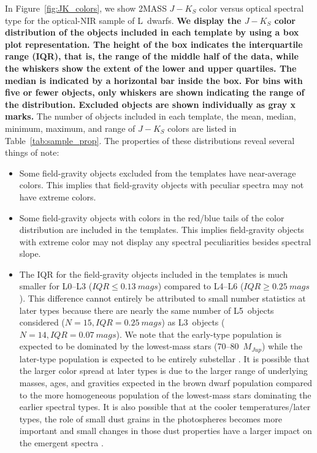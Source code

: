 \documentclass[12pt]{aastex6}
\begin{document}
In Figure~\ref{fig:JK_colors}, we show 2MASS $J-K_S$ color versus optical spectral type for the optical-NIR sample of L~dwarfs.
\textbf{We display the $J-K_S$ color distribution of the objects included in each template by using a box plot representation. The height of the box indicates the interquartile range (IQR), that is, the range of the middle half of the data, while the whiskers show the extent of the lower and upper quartiles. The median is indicated by a horizontal bar inside the box. For bins with five or fewer objects, only whiskers are shown indicating the range of the distribution. Excluded objects are shown individually as gray x marks.}
The number of objects included in each template, the mean, median, minimum, maximum, and range of $J-K_S$ colors are listed in Table~\ref{tab:sample_prop}.
The properties of these distributions reveal several things of note:
\begin{itemize}
\item Some field-gravity objects excluded from the templates have near-average colors. This implies that field-gravity objects with peculiar spectra may not have extreme colors.
\item Some field-gravity objects with colors in the red/blue tails of the color distribution are included in the templates. This implies field-gravity objects with extreme color may not display any spectral peculiarities besides spectral slope.
\item The IQR for the field-gravity objects included in the templates is much smaller for L0--L3 ($IQR\le0.13~mags$) compared to L4--L6 ($IQR\ge0.25~mags$).
This difference cannot entirely be attributed to small number statistics at later types because there are nearly the same number of L5~objects considered ($N=15,IQR=0.25~mags$) as L3~objects ($N=14,IQR=0.07~mags$).
We note that the early-type population is expected to be dominated by the lowest-mass stars (70--80~$M_{Jup}$) while the later-type population is expected to be entirely substellar \citep{Burrows01}.
It is possible that the larger color spread at later types is due to the larger range of underlying masses, ages, and gravities expected in the brown dwarf population compared to the more homogeneous population of the lowest-mass stars dominating the earlier spectral types.
It is also possible that at the cooler temperatures/later types, the role of small dust grains in the photospheres becomes more important and small changes in those dust properties have a larger impact on the emergent spectra \citep{Burgasser08_blue,Marocco:2014kr,Hiranaka:2016jm}.
\end{itemize}
\end{document}

